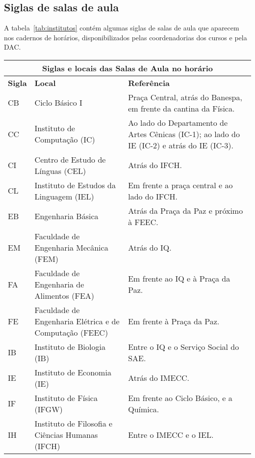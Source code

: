 \documentclass[a4paper,10pt, twocolumn]{article}
\begin{document}
\subsection{Siglas de salas de aula}
A tabela~\ref{tab:institutos} contém algumas siglas de salas de aula que aparecem nos cadernos
de horários, disponibilizados pelas coordenadorias dos cursos e pela DAC.

\begin{center}
\begin{table*}[ht!]
{
\begin{tabular}{|l|p{6cm}|p{8cm}|}\hline

\multicolumn{3}{|c|}{ \textbf{Siglas e locais das Salas de Aula no horário}}\tabularnewline \hline

 \textbf{Sigla}  &  \textbf{Local}  &  \textbf{Referência}\tabularnewline \hline

 CB  &  Ciclo Básico I  &  Praça Central, atrás do Banespa, em frente da cantina da Física.\tabularnewline \hline

 CC  &  Instituto de Computação (IC)  &  Ao lado do Departamento de Artes Cênicas (IC-1); ao lado do IE (IC-2) e atrás do IE (IC-3).\tabularnewline \hline

 CI  &  Centro de Estudo de Línguas (CEL)  &  Atrás do IFCH.\tabularnewline \hline

 CL  &  Instituto de Estudos da Linguagem (IEL)  &  Em frente a praça central e ao lado do IFCH.\tabularnewline \hline

 EB  &  Engenharia Básica  &  Atrás da Praça da Paz e próximo à FEEC.\tabularnewline \hline

 EM  &  Faculdade de Engenharia Mecânica (FEM)  &  Atrás do IQ.\tabularnewline \hline

 FA  &  Faculdade de Engenharia de Alimentos (FEA)  &  Em frente ao IQ e à Praça da Paz.\tabularnewline \hline

 FE  &  Faculdade de Engenharia Elétrica e de Computação (FEEC)  &  Em frente à Praça da Paz.\tabularnewline \hline

 IB  &  Instituto de Biologia (IB)  &  Entre o IQ e o Serviço Social do SAE.\tabularnewline \hline

 IE  &  Instituto de Economia (IE)  &  Atrás do IMECC.\tabularnewline \hline

 IF  &  Instituto de Física (IFGW)  &  Em frente ao Ciclo Básico, e a Química.\tabularnewline \hline

 IH  &  Instituto de Filosofia e Ciências Humanas (IFCH)  &  Entre o IMECC e o IEL.\tabularnewline \hline


\end{tabular}}
\end{table*}
\end{center}
\end{document}
